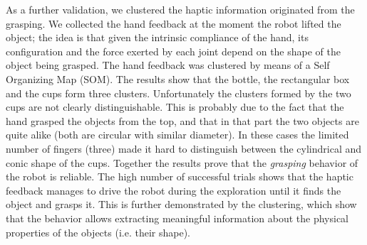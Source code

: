 As a further validation, we clustered the haptic information
originated from the grasping. We collected the hand feedback at
the moment the robot lifted the object; the idea is that given the
intrinsic compliance of the hand, its configuration and the force
exerted by each joint depend on the shape of the object being
grasped. The hand feedback was clustered by means of a Self
Organizing Map (SOM). The results show that the bottle, the
rectangular box and the cups form three clusters. Unfortunately
the clusters formed by the two cups are not clearly
distinguishable. This is probably due to the fact that the hand
grasped the objects from the top, and that in that part the two
objects are quite alike (both are circular with similar diameter).
In these cases the limited number of fingers (three) made it hard
to distinguish between the cylindrical and conic shape of the
cups. Together the results prove that the \emph{grasping} behavior
of the robot is reliable. The high number of successful trials
shows that the haptic feedback manages to drive the robot during
the exploration until it finds the object and grasps it. This is
further demonstrated by the clustering, which show that the
behavior allows extracting meaningful information about the
physical properties of the objects (i.e. their shape).

